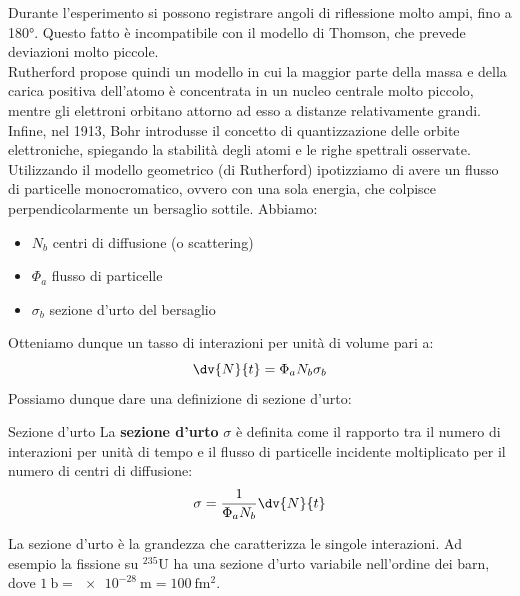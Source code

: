 Durante l'esperimento si possono registrare angoli di riflessione molto ampi, fino a 180°. Questo fatto è incompatibile con il modello di Thomson, che prevede deviazioni molto piccole.\\
Rutherford propose quindi un modello in cui la maggior parte della massa e della carica positiva dell'atomo è concentrata in un nucleo centrale molto piccolo, mentre gli elettroni orbitano attorno ad esso a distanze relativamente grandi.
Infine, nel 1913, Bohr introdusse il concetto di quantizzazione delle orbite elettroniche, spiegando la stabilità degli atomi e le righe spettrali osservate.\\
Utilizzando il modello geometrico (di Rutherford) ipotizziamo di avere un flusso di particelle monocromatico, ovvero con una sola energia, che colpisce perpendicolarmente un bersaglio sottile. Abbiamo:
\begin{itemize}
 \item $N_b$ centri di diffusione (o scattering)
 \item $\Phi_a$ flusso di particelle
 \item $\sigma_b$ sezione d'urto del bersaglio
\end{itemize}
Otteniamo dunque un tasso di interazioni per unità di volume pari a:
\begin{equation}
 \dv{N}{t} = \Phi_a N_b \sigma_b
\end{equation}
Possiamo dunque dare una definizione di sezione d'urto:
\begin{definition}{Sezione d'urto}
    La \textbf{sezione d'urto} $\sigma$ è definita come il rapporto tra il numero di interazioni per unità di tempo e il flusso di particelle incidente moltiplicato per il numero di centri di diffusione:
    \begin{equation}
     \sigma = \dfrac{1}{\Phi_a N_b} \dv{N}{t}
    \end{equation}
\end{definition}
La sezione d'urto è la grandezza che caratterizza le singole interazioni. Ad esempio la fissione su $^{235}\text{U}$ ha una sezione d'urto variabile nell'ordine dei barn, dove $\qty{1}{\barn} = \qty{e-28}{\meter} = \qty{100}{\femto\meter\squared}$.


